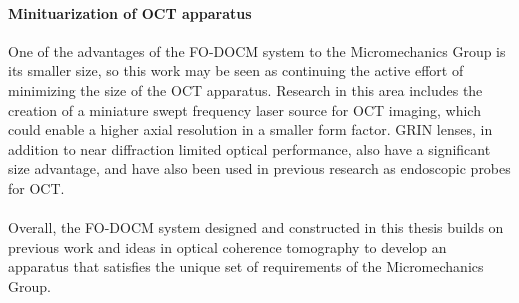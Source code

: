 
\paragraph{Minituarization of OCT apparatus} One of the advantages of the FO-DOCM system to the Micromechanics Group is its smaller size, so this work may be seen as continuing the active effort of minimizing the size of the OCT apparatus. Research in this area includes the creation of a miniature swept frequency laser source for OCT imaging, which could enable a higher axial resolution in a smaller form factor. \cite{Goldberg2009} GRIN lenses, in addition to near diffraction limited optical performance, also have a significant size advantage, and have also been used in previous research as endoscopic probes for OCT. \cite{Xie2006}





% 





\paragraph{} Overall, the FO-DOCM system designed and constructed in this thesis builds on previous work and ideas in optical coherence tomography to develop an apparatus that satisfies the unique set of requirements of the Micromechanics Group.